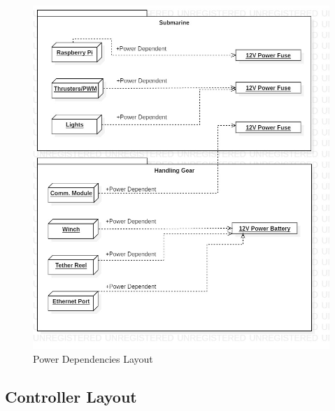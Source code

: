 \documentclass[
18pt, %
a4paper, %
oneside, %
headinclude,footinclude, %
]{scrartcl}
\begin{document}
\begin{figure}[H]
	\centering 
	\hspace*{-2cm}
	\includegraphics[width=1.1\columnwidth]{Figures/Component_Diagrams/schematic_pwr.jpg}
	\caption[]{Power Dependencies Layout} %
\end{figure}



\subsection{Controller Layout}
\end{document}
